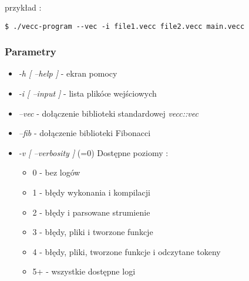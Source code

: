 \documentclass[11pt]{article} %
\begin{document}
przykład :
\begin{verbatim}
$ ./vecc-program --vec -i file1.vecc file2.vecc main.vecc
\end{verbatim}

\subsubsection{Parametry}
\begin{itemize}
\item \textit{-h [ --help ]} - ekran pomocy           

\item \textit{-i [ --input ]} - lista plikóœ wejściowych          

\item \textit{--vec} - dołączenie biblioteki standardowej \textit{vecc::vec}                      

\item \textit{--fib} - dołączenie biblioteki Fibonacci      

\item \textit{-v [ --verbosity ]} (=0)    
Dostępne poziomy :
\begin{itemize}
	\item 0  -  bez logów
	\item 1  -  błędy wykonania i kompilacji
	\item 2  -  błędy i parsowane strumienie
	\item 3  -  błędy, pliki i tworzone funkcje
	\item 4  -  błędy, pliki, tworzone funkcje i odczytane tokeny
	\item 5+ -  wszystkie dostępne logi
\end{itemize} 
\end{itemize}
\end{document}
